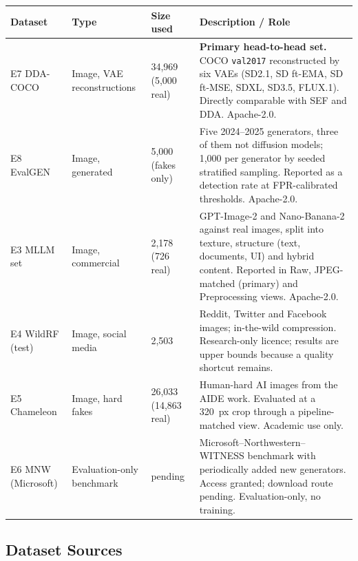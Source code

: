 \begin{longtable}{p{2.9cm} p{2.3cm} p{2.4cm} p{6.6cm}}
\toprule
\textbf{Dataset} & \textbf{Type} & \textbf{Size used} & \textbf{Description / Role} \\
\midrule
\endhead
E7 DDA-COCO & Image, VAE reconstructions & 34{,}969 (5{,}000 real) & \textbf{Primary head-to-head set.} COCO \texttt{val2017} reconstructed by six VAEs (SD2.1, SD ft-EMA, SD ft-MSE, SDXL, SD3.5, FLUX.1). Directly comparable with SEF and DDA. Apache-2.0. \\
\midrule
E8 EvalGEN & Image, generated & 5{,}000 (fakes only) & Five 2024--2025 generators, three of them not diffusion models; 1{,}000 per generator by seeded stratified sampling. Reported as a detection rate at FPR-calibrated thresholds. Apache-2.0. \\
\midrule
E3 MLLM set & Image, commercial & 2{,}178 (726 real) & GPT-Image-2 and Nano-Banana-2 against real images, split into texture, structure (text, documents, UI) and hybrid content. Reported in Raw, JPEG-matched (primary) and Preprocessing views. Apache-2.0. \\
\midrule
E4 WildRF (test) & Image, social media & 2{,}503 & Reddit, Twitter and Facebook images; in-the-wild compression. Research-only licence; results are upper bounds because a quality shortcut remains. \\
\midrule
E5 Chameleon & Image, hard fakes & 26{,}033 (14{,}863 real) & Human-hard AI images from the AIDE work. Evaluated at a 320~px crop through a pipeline-matched view. Academic use only. \\
\midrule
E6 MNW (Microsoft) & Evaluation-only benchmark & pending & Microsoft--Northwestern--WITNESS benchmark with periodically added new generators. Access granted; download route pending. Evaluation-only, no training. \\
\bottomrule
\end{longtable}

\subsection{Dataset Sources}

